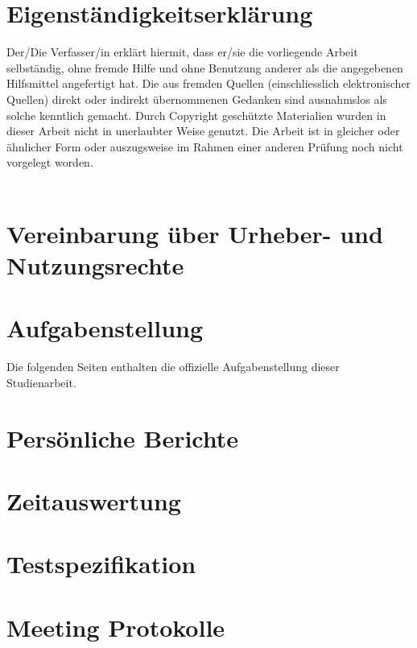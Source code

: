 \documentclass[11pt,a4paper,english,oneside]{book}
\numberwithin{equation}{chapter}
\begin{document}
	\printglossary
	\glsaddall
	
	\printbibliography[heading=bibintoc]
	
	{
		\hypersetup{linkcolor=black}
		\listoffigures
	}
	
	{
		\hypersetup{linkcolor=black}
		\listoftables
	}
	
	
	
	\chapter{Eigenständigkeitserklärung}
	Der/Die Verfasser/in erklärt hiermit, dass er/sie die vorliegende Arbeit selbständig, ohne fremde Hilfe und ohne Benutzung anderer als die angegebenen Hilfsmittel angefertigt hat. Die aus fremden Quellen (einschliesslich elektronischer Quellen) direkt oder indirekt übernommenen Gedanken sind ausnahmslos als solche kenntlich gemacht. Durch Copyright geschützte Materialien wurden in dieser Arbeit nicht in unerlaubter Weise genutzt. Die Arbeit ist in gleicher oder ähnlicher Form oder auszugsweise im Rahmen einer anderen Prüfung noch nicht vorgelegt worden.\\[2cm]
	 \hfill {}
	\hfill \\[2cm]
	 \hfill {}
	
	\chapter{Vereinbarung über Urheber- und Nutzungsrechte}
	
	
	\chapter{Aufgabenstellung}
	\label{aufgabenstellung}
	Die folgenden Seiten enthalten die offizielle Aufgabenstellung dieser Studienarbeit.
	
    


	\chapter{Persönliche Berichte}
	\label{erfahrungsberichte}
	
	\chapter{Zeitauswertung}
	\label{zeitauswertung}
	
	\chapter{Testspezifikation}
	
	\chapter{Meeting Protokolle} \label{ch:minutes}
	
	
	
\end{document}
